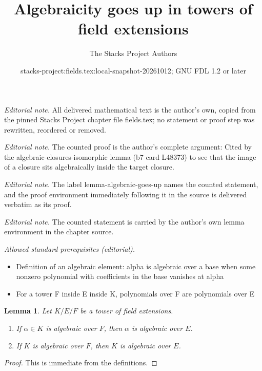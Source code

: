 \documentclass[10pt,a4paper]{amsart}
\title{Algebraicity goes up in towers of field extensions}
\author{The Stacks Project Authors}
\date{stacks-project:fields.tex:local-snapshot-20261012; GNU FDL 1.2 or later}
\theoremstyle{plain}
\newtheorem{lemma}[subsection]{Lemma}
\theoremstyle{definition}
\theoremstyle{remark}
\numberwithin{equation}{subsection}
\begin{document}
\maketitle
\noindent\textit{Editorial note.} All delivered mathematical text is the author's own, copied from the pinned Stacks Project chapter file fields.tex; no statement or proof step was rewritten, reordered or removed.\par\medskip
\noindent\textit{Editorial note.} The counted proof is the author's complete argument: Cited by the algebraic-closures-isomorphic lemma (b7 card L48373) to see that the image of a closure sits algebraically inside the target closure.\par\medskip
\noindent\textit{Editorial note.} The label lemma-algebraic-goes-up names the counted statement, and the proof environment immediately following it in the source is delivered verbatim as its proof.\par\medskip
\noindent\textit{Editorial note.} The counted statement is carried by the author's own lemma environment in the chapter source.\par\medskip
\noindent\textit{Allowed standard prerequisites (editorial).}\begin{itemize}
\item Definition of an algebraic element: alpha is algebraic over a base when some nonzero polynomial with coefficients in the base vanishes at alpha
\item For a tower F inside E inside K, polynomials over F are polynomials over E
\end{itemize}\medskip
\begin{lemma}
\label{lemma-algebraic-goes-up}
Let $K/E/F$ be a tower of field extensions.
\begin{enumerate}
\item If $\alpha \in K$ is algebraic over $F$, then $\alpha$ is algebraic
over $E$.
\item If $K$ is algebraic over $F$, then $K$ is algebraic over $E$.
\end{enumerate}
\end{lemma}

\begin{proof}
This is immediate from the definitions.
\end{proof}
\end{document}
